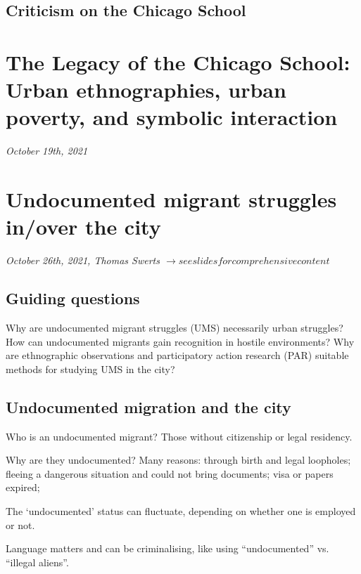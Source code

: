 \documentclass{article}
\begin{document}
\subsection{Criticism on the Chicago School}


\section{The Legacy of the Chicago School: Urban ethnographies, urban poverty, and symbolic interaction}
\textit{October 19th, 2021}



\section{Undocumented migrant struggles in/over the city}
\textit{October 26th, 2021, Thomas Swerts $\rightarrow see slides for comprehensive content$}

\subsection{Guiding questions}

\begin{outline}
	\1 Why are undocumented migrant struggles (UMS) necessarily urban struggles?
	\1 How can undocumented migrants gain recognition in hostile environments?
	\1 Why are ethnographic observations and participatory action research (PAR) suitable methods for studying UMS in the city?
\end{outline}

\subsection{Undocumented migration and the city}

Who is an undocumented migrant? Those without citizenship or legal residency.

Why are they undocumented? Many reasons: through birth and legal loopholes; fleeing a dangerous situation and could not bring documents; visa or papers expired; 

The `undocumented' status can fluctuate, depending on whether one is employed or not. 

Language matters and can be criminalising, like using ``undocumented'' vs. ``illegal aliens''.
\end{document}
